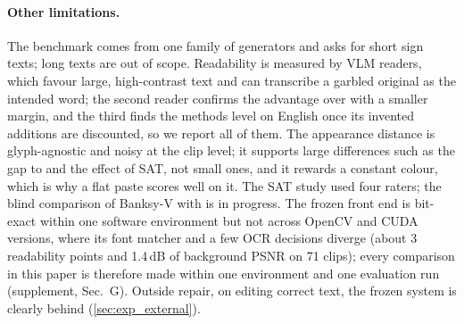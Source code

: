 \paragraph{Other limitations.} The benchmark comes from one family of generators and asks for short sign texts; long texts are out of scope. Readability is measured by VLM readers, which favour large, high-contrast text and can transcribe a garbled original as the intended word; the second reader confirms the advantage over \steer with a smaller margin, and the third finds the methods level on English once its invented additions are discounted, so we report all of them. The appearance distance is glyph-agnostic and noisy at the clip level; it supports large differences such as the gap to \steer and the effect of SAT, not small ones, and it rewards a constant colour, which is why a flat paste scores well on it. The SAT study used four raters; the blind comparison of Banksy-V with \steer is in progress. The frozen front end is bit-exact within one software environment but not across OpenCV and CUDA versions, where its font matcher and a few OCR decisions diverge (about 3 readability points and 1.4\,dB of background PSNR on 71 clips); every comparison in this paper is therefore made within one environment and one evaluation run (supplement, Sec.~G). Outside repair, on editing correct text, the frozen system is clearly behind \steer (\cref{sec:exp_external}).
